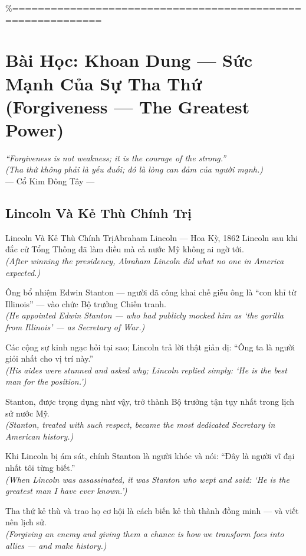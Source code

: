 \%============================================================
\chapter{Bài Học: Khoan Dung --- Sức Mạnh Của Sự Tha Thứ (Forgiveness --- The Greatest Power)}
\begin{center}
  \textit{\color{truyengold}``Forgiveness is not weakness; it is the courage of the strong.''}\\[4pt]
  \textit{(Tha thứ không phải là yếu đuối; đó là lòng can đảm của người mạnh.)}\\[4pt]
  \small\color{truyenblue}--- Cổ Kim Đông Tây ---
\end{center}
\ngancach

\section{Lincoln Và Kẻ Thù Chính Trị}
\begin{truyen}{Lincoln Và Kẻ Thù Chính Trị}{Abraham Lincoln --- Hoa Kỳ, 1862}
 Lincoln sau khi đắc cử Tổng Thống đã làm điều mà cả nước Mỹ không ai ngờ tới.\\[4pt]
\textit{(After winning the presidency, Abraham Lincoln did what no one in America expected.)}

Ông bổ nhiệm Edwin Stanton --- người đã công khai chế giễu ông là ``con khỉ từ Illinois'' --- vào chức Bộ trưởng Chiến tranh.\\[4pt]
\textit{(He appointed Edwin Stanton --- who had publicly mocked him as `the gorilla from Illinois' --- as Secretary of War.)}

Các cộng sự kinh ngạc hỏi tại sao; Lincoln trả lời thật giản dị: ``Ông ta là người giỏi nhất cho vị trí này.''\\[4pt]
\textit{(His aides were stunned and asked why; Lincoln replied simply: `He is the best man for the position.')}

Stanton, được trọng dụng như vậy, trở thành Bộ trưởng tận tụy nhất trong lịch sử nước Mỹ.\\[4pt]
\textit{(Stanton, treated with such respect, became the most dedicated Secretary in American history.)}

Khi Lincoln bị ám sát, chính Stanton là người khóc và nói: ``Đây là người vĩ đại nhất tôi từng biết.''\\[4pt]
\textit{(When Lincoln was assassinated, it was Stanton who wept and said: `He is the greatest man I have ever known.')}

\end{truyen}
\begin{baihoc}
  Tha thứ kẻ thù và trao họ cơ hội là cách biến kẻ thù thành đồng minh --- và viết nên lịch sử.\\[4pt]
  \textit{(Forgiving an enemy and giving them a chance is how we transform foes into allies --- and make history.)}
\end{baihoc}

